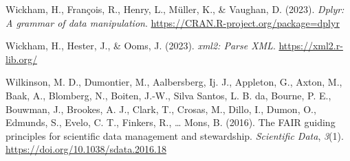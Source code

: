 \documentclass[
]{book}
\newlength{\cslhangindent}
\newlength{\cslentryspacingunit} %
\newenvironment{CSLReferences}[2] %
 {%
  \setlength{\parindent}{0pt}
  \ifodd #1
  \let\oldpar\par
  \def\par{\hangindent=\cslhangindent\oldpar}
  \fi
  \setlength{\parskip}{#2\cslentryspacingunit}
 }%
 {}
\begin{document}
\begin{CSLReferences}{1}{0}
\leavevmode{}%
Wickham, H., François, R., Henry, L., Müller, K., \& Vaughan, D. (2023). \emph{Dplyr: A grammar of data manipulation}. \url{https://CRAN.R-project.org/package=dplyr}

\leavevmode{}%
Wickham, H., Hester, J., \& Ooms, J. (2023). \emph{xml2: Parse XML}. \url{https://xml2.r-lib.org/}

\leavevmode{}%
Wilkinson, M. D., Dumontier, M., Aalbersberg, Ij. J., Appleton, G., Axton, M., Baak, A., Blomberg, N., Boiten, J.-W., Silva Santos, L. B. da, Bourne, P. E., Bouwman, J., Brookes, A. J., Clark, T., Crosas, M., Dillo, I., Dumon, O., Edmunds, S., Evelo, C. T., Finkers, R., \ldots{} Mons, B. (2016). The FAIR guiding principles for scientific data management and stewardship. \emph{Scientific Data}, \emph{3}(1). \url{https://doi.org/10.1038/sdata.2016.18}

\end{CSLReferences}
\end{document}
